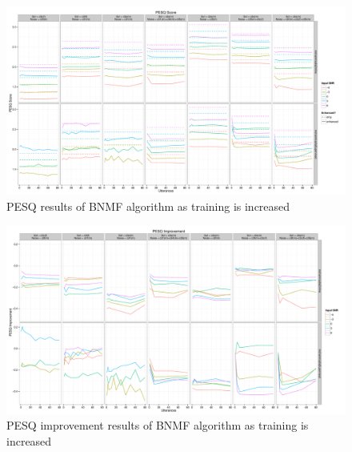 \begin{figure}[p]
\noindent \begin{centering}
\includegraphics[angle=90,width=1\textwidth,height=0.95\textheight]{fig/R/train/pesq}
\par\end{centering}

\protect\caption{\label{fig:vary-train-pesq}\acs{PESQ} results of \acs{BNMF} algorithm
as training is increased}
\end{figure}


\begin{figure}[p]
\noindent \begin{centering}
\includegraphics[angle=90,width=1\textwidth,height=0.95\textheight]{fig/R/train/pesqImp}
\par\end{centering}

\protect\caption{\label{fig:vary-train-pesq-imp}\acs{PESQ} improvement results of
\acs{BNMF} algorithm as training is increased}


\end{figure}


